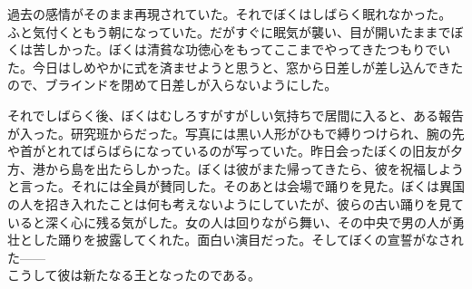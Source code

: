 \documentclass[b5j,twoside,twocolumn]{utarticle}
\begin{document}
過去の感情がそのまま再現されていた。それでぼくはしばらく眠れなかった。\\



ふと気付くともう朝になっていた。だがすぐに眠気が襲い、目が開いたままでぼくは苦しかった。ぼくは清貧な功徳心をもってここまでやってきたつもりでいた。今日はしめやかに式を済ませようと思うと、窓から日差しが差し込んできたので、ブラインドを閉めて日差しが入らないようにした。


それでしばらく後、ぼくはむしろすがすがしい気持ちで居間に入ると、ある報告が入った。研究班からだった。写真には黒い人形がひもで縛りつけられ、腕の先や首がとれてばらばらになっているのが写っていた。昨日会ったぼくの旧友が夕方、港から島を出たらしかった。ぼくは彼がまた帰ってきたら、彼を祝福しようと言った。それには全員が賛同した。そのあとは会場で踊りを見た。ぼくは異国の人を招き入れたことは何も考えないようにしていたが、彼らの古い踊りを見ていると深く心に残る気がした。女の人は回りながら舞い、その中央で男の人が勇壮とした踊りを披露してくれた。面白い演目だった。そしてぼくの宣誓がなされた\tbaselineshift=2.5pt------\tbaselineshift=4.0pt\\
こうして彼は新たなる王となったのである。
\end{document}
